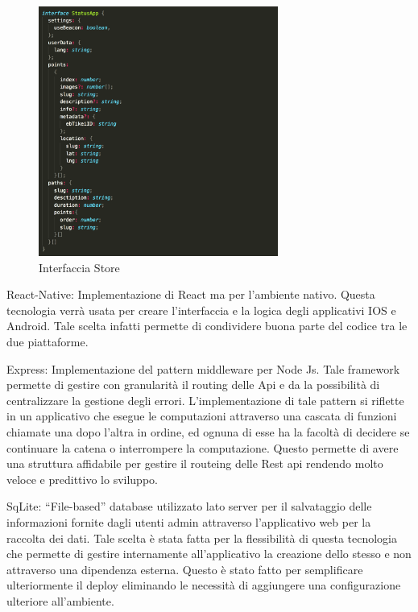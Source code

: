 \begin{figure}[h]
\centering
\includegraphics[width=0.7\textwidth]{images/store.png}
\caption{Interfaccia Store}
\end{figure}
\vspace{5mm}

	React-Native: Implementazione di React ma per l’ambiente nativo. Questa tecnologia verrà usata per creare l’interfaccia e la logica degli applicativi IOS e Android. Tale scelta infatti permette di condividere buona parte del codice tra le due piattaforme.\vspace{5mm}

	Express: Implementazione del pattern middleware per Node Js. Tale framework permette di gestire con granularità il routing delle Api e da la possibilità di centralizzare la gestione degli errori. L'implementazione di tale pattern si riflette in un applicativo che esegue le computazioni attraverso una cascata di funzioni chiamate una dopo l'altra in ordine, ed ognuna di esse ha la facoltà di decidere se continuare la catena o interrompere la computazione. Questo permette di avere una struttura affidabile per gestire il routeing delle Rest api rendendo molto veloce e predittivo lo sviluppo.\vspace{5mm}

	SqLite: “File-based” database utilizzato lato server per il salvataggio delle informazioni fornite dagli utenti admin attraverso l’applicativo web per la raccolta dei dati. Tale scelta è stata fatta per la flessibilità di questa tecnologia che permette di gestire internamente all’applicativo la creazione dello stesso e non attraverso una dipendenza esterna. Questo è stato fatto per semplificare ulteriormente il deploy eliminando le necessità di aggiungere una configurazione ulteriore all’ambiente.\vspace{5mm}
	
